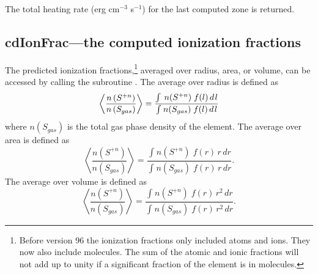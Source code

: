 The total heating rate (erg cm$^{-3}$ s$^{-1}$)
for the last computed zone is returned.

\subsection{cdIonFrac---the computed ionization fractions}

The predicted ionization fractions,\footnote{Before version 96 the ionization fractions only included atoms and
ions.  They now also include molecules.  The sum of the atomic and ionic
fractions will not add up to unity if a significant fraction of the element
is in molecules.} averaged over radius, area, or volume,
can be accessed by calling the subroutine .
The average over radius is defined as
\begin{equation}
\left\langle {\frac{{n\left( {{S^{ + n}}} \right)}}{{n\left( {{S_{gas}}}
\right)}}} \right\rangle  = \frac{{\int_{}^{} {\,n({S^{ + n}})\;f(l)\,d{\kern
1pt} l} }}{{\int_{}^{} {n({S_{gas}})\;f(l)\,d{\kern 1pt} l} }}
\end{equation}
where $n(S_{gas})$ is the total gas phase density of the element.
The average
over area is defined as
\begin{equation}
\left\langle {\frac{{n\left( {{S^{ + n}}} \right)}}{{n\left( {{S_{gas}}}
\right)}}} \right\rangle  = \frac{{\int_{}^{} {n({S^{ + n}})\;f(r)\,r\,dr}
}}{{\int_{}^{} {n({S_{gas}})\;f(r)\,r\,dr} }}.
\end{equation}
The average
over volume  is defined as
\begin{equation}
\left\langle {\frac{{n\left( {{S^{ + n}}} \right)}}{{n\left( {{S_{gas}}}
\right)}}} \right\rangle  = \frac{{\int_{}^{} {n({S^{ + n}})\;f(r)\,r^2\,dr}
}}{{\int_{}^{} {n({S_{gas}})\;f(r)\,r^2\,dr} }}.
\end{equation}

